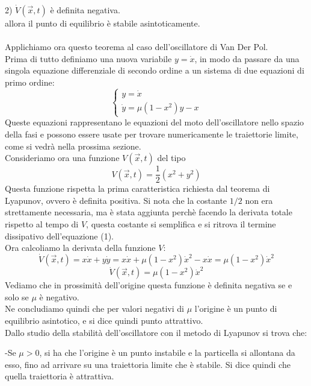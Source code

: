 \documentclass[12pt]{article}
\begin{document}
2) $\dot{V}(\vec{x},t)$ è definita negativa. \\
allora il punto di equilibrio è stabile asintoticamente. \\ \\
Applichiamo ora questo teorema al caso dell'oscillatore di Van Der Pol.  \\
Prima di tutto definiamo una nuova variabile $y = \dot{x}$, in modo da passare da una singola equazione differenziale di secondo ordine a un sistema di due equazioni di primo ordine:
\begin{equation}
	\begin{cases}
		y = \dot{x} \\
		\dot{y} = \mu(1-x^2)y - x
	\end{cases}
\end{equation}
Queste equazioni rappresentano le equazioni del moto dell'oscillatore nello spazio della fasi e possono essere usate per trovare numericamente le traiettorie limite, come si vedrà nella prossima sezione. \\
Consideriamo ora una funzione $V(\vec{x},t)$ del tipo 
\begin{equation}
	V(\vec{x},t) = \frac{1}{2}(x^2 + y^2)
\end{equation}
Questa funzione rispetta la prima caratteristica richiesta dal teorema di Lyapunov, ovvero è definita positiva. Si nota che la costante $1/2$ non era strettamente necessaria, ma è stata aggiunta perchè facendo la derivata totale rispetto al tempo di $V$, questa costante si semplifica e si ritrova il termine dissipativo dell'equazione (1). \\
Ora calcoliamo la derivata della funzione $V$:
$$
	\dot{V}(\vec{x},t) = x\dot{x} + y\dot{y} = x\dot{x} + \mu(1-x^2)\dot{x}^2-x\dot{x} = \mu(1-x^2)\dot{x}^2
$$
\begin{equation}
	\dot{V}(\vec{x},t) = \mu(1-x^2)\dot{x}^2
\end{equation}
Vediamo che in prossimità dell'origine questa funzione è definita negativa se e solo se $\mu$ è negativo. \\
Ne concludiamo quindi che per valori negativi di $\mu$ l'origine è un punto di equilibrio asintotico, e si dice quindi punto attrattivo. \\
Dallo studio della stabilità dell'oscillatore con il metodo di Lyapunov si trova che: 

-Se $\mu>0$, si ha che l'origine è un punto instabile e la particella si allontana da esso, fino ad arrivare su una traiettoria limite che è stabile. Si dice quindi che quella traiettoria è attrattiva. 
\end{document}
